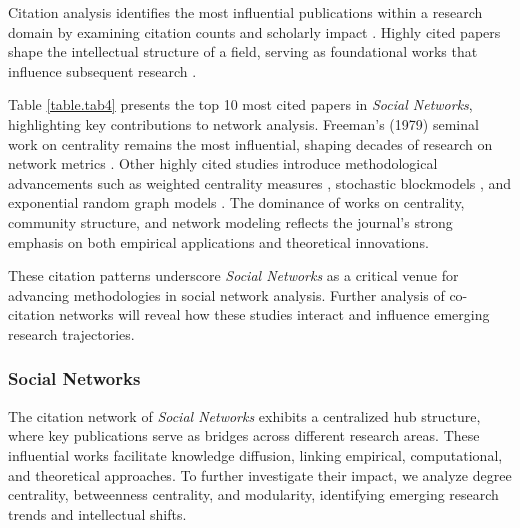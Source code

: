 \documentclass[twocolumn]{article}
\begin{document}
Citation analysis identifies the most influential publications within a research domain by examining citation counts and scholarly impact \cite{Garfield1972, Small1973}. Highly cited papers shape the intellectual structure of a field, serving as foundational works that influence subsequent research \cite{Leydesdorff1998, Moed2005}. 

Table \ref{table.tab4} presents the top 10 most cited papers in \textit{Social Networks}, highlighting key contributions to network analysis. Freeman’s (1979) seminal work on centrality remains the most influential, shaping decades of research on network metrics \cite{Freeman1979}. Other highly cited studies introduce methodological advancements such as weighted centrality measures \cite{Opsahl2010}, stochastic blockmodels \cite{Holland1983}, and exponential random graph models \cite{Robins2007}. The dominance of works on centrality, community structure, and network modeling reflects the journal’s strong emphasis on both empirical applications and theoretical innovations.

These citation patterns underscore \textit{Social Networks} as a critical venue for advancing methodologies in social network analysis. Further analysis of co-citation networks will reveal how these studies interact and influence emerging research trajectories.


	\subsubsection*{Social Networks}
	
	The citation network of \textit{Social Networks} exhibits a centralized hub structure, where key publications serve as bridges across different research areas. These influential works facilitate knowledge diffusion, linking empirical, computational, and theoretical approaches. To further investigate their impact, we analyze degree centrality, betweenness centrality, and modularity, identifying emerging research trends and intellectual shifts.
	
\end{document}
